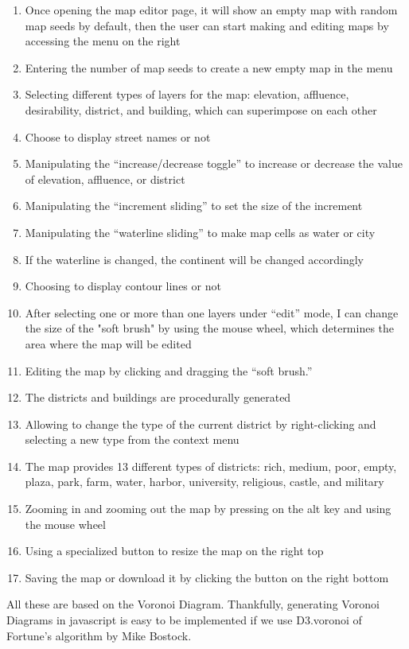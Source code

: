 \begin{enumerate}
  \item Once opening the map editor page, it will show an empty map with random map seeds by default, then the user can start making and editing maps by accessing the menu on the right
  \item Entering the number of map seeds to create a new empty map in the menu
  \item Selecting different types of layers for the map: elevation, affluence, desirability, district, and building, which can superimpose on each other
  \item Choose to display street names or not
  \item Manipulating the ``increase/decrease toggle'' to increase or decrease the value of elevation, affluence, or district
  \item Manipulating the ``increment sliding'' to set the size of the increment
  \item Manipulating the ``waterline sliding'' to make map cells as water or city
  \item If the waterline is changed, the continent will be changed accordingly
  \item Choosing to display contour lines or not
  \item After selecting one or more than one layers under ``edit'' mode, I can change the size of the "soft brush" by using the mouse wheel, which determines the area where the map will be edited
  \item Editing the map by clicking and dragging the ``soft brush.''
  \item The districts and buildings are procedurally generated
  \item Allowing to change the type of the current district by right-clicking and selecting a new type from the context menu
  \item The map provides 13 different types of districts: rich, medium, poor, empty, plaza, park, farm, water, harbor, university, religious, castle, and military
  \item Zooming in and zooming out the map by pressing on the alt key and using the mouse wheel
  \item Using a specialized button to resize the map on the right top
  \item Saving the map or download it by clicking the button on the right bottom
\end{enumerate}

All these are based on the Voronoi Diagram. Thankfully, generating Voronoi Diagrams in javascript is easy to be implemented if we use D3.voronoi of Fortune’s algorithm by Mike Bostock.
